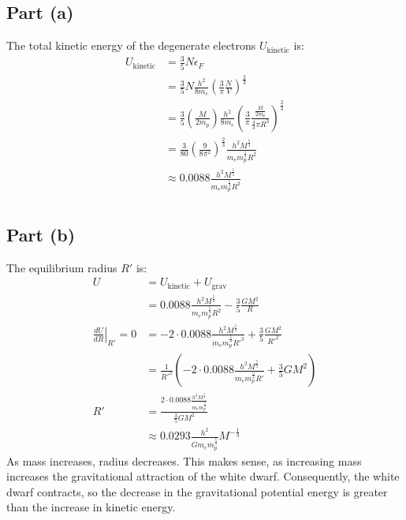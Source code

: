 \documentclass{article}
\begin{document}
\subsection*{Part (a)}
The total kinetic energy of the degenerate electrons $U_{\text{kinetic}}$ is:
\begin{equation}
    \begin{split}
        U_{\text{kinetic}} & = \frac{3}{5}N\epsilon_F \\
        & = \frac{3}{5}N\frac{h^2}{8m_e}(\frac{3}{\pi}\frac{N}{V})^{\frac{2}{3}} \\
        & = \frac{3}{5}(\frac{M}{2m_p})\frac{h^2}{8m_e}(\frac{3}{\pi}\frac{\frac{M}{2m_p}}{\frac{4}{3}\pi R^3})^{\frac{2}{3}} \\
        & = \frac{3}{80}(\frac{9}{8\pi^2})^{\frac{2}{3}}\frac{h^2M^{\frac{5}{3}}}{m_em_p^{\frac{5}{3}}R^2} \\
        & \approx 0.0088\frac{h^2M^{\frac{5}{3}}}{m_em_p^{\frac{5}{3}}R^2} \\
    \end{split}
\end{equation}
\subsection*{Part (b)}
\begin{center}
\end{center}

The equilibrium radius $R'$ is:
\begin{equation}
    \begin{split}
        U & = U_{\text{kinetic}} + U_{\text{grav}} \\
        & = 0.0088\frac{h^2M^{\frac{5}{3}}}{m_em_p^{\frac{5}{3}}R^2} - \frac{3}{5}\frac{GM^2}{R} \\
        \left.\frac{dU}{dR}\right\vert_{R'} = 0 & = -2 \cdot 0.0088\frac{h^2M^{\frac{5}{3}}}{m_em_p^{\frac{5}{3}}R'^3} + \frac{3}{5}\frac{GM^2}{R'^2} \\
        & = \frac{1}{R'^2}(-2 \cdot 0.0088\frac{h^2M^{\frac{5}{3}}}{m_em_p^{\frac{5}{3}}R'} + \frac{3}{5}GM^2)\\
        R' & = \frac{2 \cdot 0.0088\frac{h^2M^{\frac{5}{3}}}{m_em_p^{\frac{5}{3}}}}{\frac{3}{5}GM^2} \\
        & \approx 0.0293\frac{h^2}{Gm_em_p^{\frac{5}{3}}}M^{-\frac{1}{3}}
    \end{split}
\end{equation}
As mass increases, radius decreases. This makes sense, as increasing mass increases the gravitational attraction of the white dwarf. Consequently, the white dwarf contracts, so the decrease in the gravitational potential energy is greater than the increase in kinetic energy.
\end{document}
